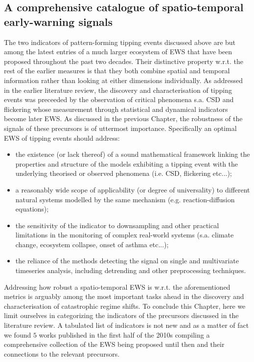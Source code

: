 \documentclass[../main.tex]{subfiles}
\begin{document}
\subsection{A comprehensive catalogue of spatio-temporal early-warning signals}\label{subsec3.3}
The two indicators of pattern-forming tipping events discussed above are but among the latest entries of a much larger ecosystem of EWS that have been proposed throughout the past two decades. 
Their distinctive property w.r.t. the rest of the earlier measures is that they both combine spatial and temporal information rather than looking at either dimensions individually.
As addressed in the earlier literature review, the discovery and characterisation of tipping events was preceeded by the observation of critical phenomena s.a. CSD and flickering whose measurement through statistical and dynamical indicators become later EWS.
As discussed in the previous Chapter, the robustness of the signals of these precursors is of uttermost importance.
Specifically an optimal EWS of tipping events should address: 
\begin{itemize}
     \item the existence (or lack thereof) of a sound mathematical framework linking the properties and structure of the models exhibiting a tipping event with the underlying theorised or observed phenomena (i.e. CSD, flickering etc...);
     \item a reasonably wide scope of applicability (or degree of universality) to different natural systems modelled by the same mechanism (e.g. reaction-diffusion equations);
     \item the sensitivity of the indicator to downsampling and other practical limitations in the monitoring of complex real-world systems (s.a. climate change, ecosystem collapse, onset of asthma etc...);
     \item the reliance of the methods detecting the signal on single and multivariate timeseries analysis, including detrending and other preprocessing techniques.
\end{itemize}
Addressing how robust a spatio-temporal EWS is w.r.t. the aforementioned metrics is arguably among the most important tasks ahead in the discovery and characterisation of catastrophic regime shifts. 
To conclude this Chapter, here we limit ourselves in categorizing the indicators of the precursors discussed in the literature review.
A tabulated list of indicators is not new and as a matter of fact we found $5$ works \cite{Lenton11, Dakos12a, Scheffer12, Kefi14, Scheffer15} published in the first half of the 2010s compiling a comprehensive collection of the EWS being proposed until then and their connections to the relevant precursors.
\end{document}
